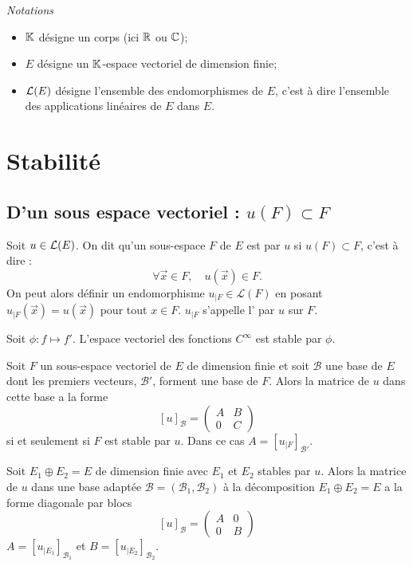 \documentclass[a4paper]{book}
\begin{document}
\textit{Notations}
\begin{itemize}
\item $\mathbb{K} $ désigne un corps (ici $\mathbb{R}$ ou $\mathbb{C}$);
\item $E$ désigne un $\mathbb{K} $-espace vectoriel de dimension finie;
\item $\mathcal{L}(E)$ désigne l'ensemble des endomorphismes de $E$,
  c'est à dire  l'ensemble des applications linéaires de $E$ dans $E$.
\end{itemize}



\section{Stabilité}
\subsection{D'un sous espace vectoriel : $u(F)\subset F$}

\begin{Definition}[Stable] Soit $u\in \mathcal{L}(E)$. On dit qu'un sous-espace $F$ de $E$ est  par $u$ si $u(F)\subset F$, c'est à dire :
$$\forall \vec{x}\in F,\quad u(\vec{x})\in F.$$ 
On peut alors définir un endomorphisme $u_{|F}\in \mathcal{L}(F)$ en posant $u_{|F}(\vec{x})=u(\vec{x})$ pour tout $x\in F$. $u_{|F}$ s'appelle l' par $u$ sur $F$.
\end{Definition}
\begin{Exemple}[Dérivée]
Soit $\phi:f\mapsto f'.$ L'espace vectoriel des fonctions $C^{\infty}$ est stable par $\phi$. 
\end{Exemple}
\begin{Proposition} Soit $F$ un sous-espace vectoriel de $E$ de dimension finie et soit $\mathcal{B}$ une base de $E$ dont les premiers vecteurs, $\mathcal{B}'$,  forment une base de $F$. Alors la matrice de $u$ dans cette base a la forme
$$[u]_{\mathcal{B}}= \begin{pmatrix}
A & B \\ 0 & C
\end{pmatrix}$$
si et seulement si $F$ est stable par $u$. Dans ce cas $A=[u_{|F}]_{\mathcal{B}'}$.
\end{Proposition}
\begin{Proposition} Soit $E_1\oplus     E_2=E$ de dimension finie avec $E_1$ et $E_2$ stables par $u$. Alors la matrice de $u$ dans une base adaptée $\mathcal{B}=(\mathcal{B}_1,\mathcal{B}_2)$ à la décomposition $E_1\oplus     E_2=E$  a la forme diagonale par blocs
$$[u]_{\mathcal{B}}= \begin{pmatrix}
A & 0 \\ 0 & B
\end{pmatrix}$$
 $A=[u_{|E_1}]_{\mathcal{B}_1}$ et $B=[u_{|E_2}]_{\mathcal{B}_2}$.
\end{Proposition}
\end{document}
